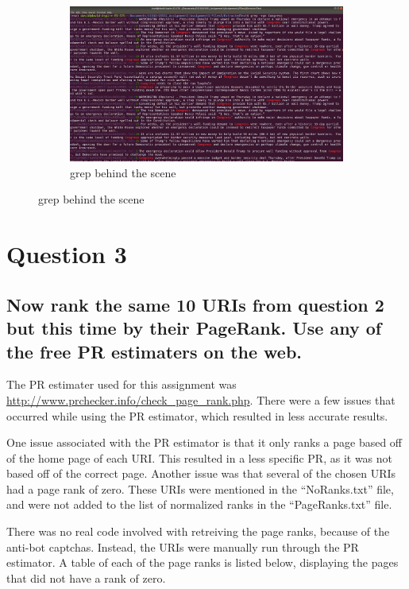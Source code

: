 \documentclass[11pt]{scrartcl} %
\begin{document}
\begin{figure}[h!]
\begin{subfigure}[b]{1.1\linewidth }
    \includegraphics[width=\linewidth]{Proofgrep.png}
    \caption{grep behind the scene}
\end{subfigure}
\end{figure}


\pagebreak
\section*{Question 3} \bigskip

\subsection*{Now rank the same 10 URIs from question 2 but this time 
by their PageRank.  Use any of the free PR estimaters on the web.}

\tabto{2.0cm} The PR estimater used for this assignment was 
\url{http://www.prchecker.info/check_page_rank.php}. There were a few issues that occurred while using the PR estimator, which resulted in less accurate results.
\newline

\tabto{2.0cm} One issue associated with the PR estimator is that it only ranks a page based off of the home page of each URI. This resulted in a less specific PR, as it was not based off of the correct page. Another issue was that several of the chosen URIs had a page rank of zero. These URIs were mentioned in the ``NoRanks.txt'' file, and were not added to the list of normalized ranks in the ``PageRanks.txt'' file.
\newline


\tabto{2.0cm} There was no real code involved with retreiving the page ranks, because of the anti-bot captchas. Instead, the URIs were manually run through the PR estimator. 
A table of each of the page ranks is listed below, displaying the pages that did not have a rank of zero.
\newline
\end{document}

